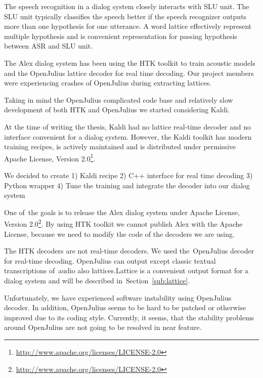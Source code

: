 The speech recognition in a dialog system closely interacts with \acl{SLU} unit.
The \ac{SLU} unit typically classifies the speech better 
if the speech recognizer outputs more than one hypothesis for one utterance. 
A word lattice effectively represent multiple hypothesis and is convenient
representation for passing hypothesis between \ac{ASR} and \ac{SLU} unit.

The Alex dialog system has been using the \ac{HTK} toolkit\cite{young94htk} 
to train acoustic models and 
the OpenJulius\cite{lee2009julius} lattice decoder for real time decoding. 
Our project members were experiencing crashes of OpenJulius during extracting lattices.

Taking in mind the OpenJulius complicated code base and relatively slow
development of both \ac{HTK} and OpenJulius we started considering Kaldi.

At the time of writing the thesis, Kaldi had no lattice real-time decoder
and no interface convenient for a dialog system.
However, the Kaldi toolkit has modern training recipes, 
is actively maintained and is distributed 
under permissive Apache License, Version 2.0\footnote{\url{http://www.apache.org/licenses/LICENSE-2.0}}.

We decided to create 
1) Kaldi recipe
2) C++ interface for real time decoding
3) Python wrapper
4) Tune the training and integrate the decoder into our dialog system



One of~the goals is to release the Alex dialog system under 
Apache License, Version 2.0\footnote{\url{http://www.apache.org/licenses/LICENSE-2.0}}. 
By using \ac{HTK} toolkit we cannot publish Alex with the Apache License, 
because we need to modify the code of the decoders we are using. 

The \ac{HTK} decoders are not real-time decoders\cite{yao2010practical}. 
We used the~OpenJulius decoder for real-time decoding. OpenJulius can output except classic textual transcriptions of~audio
also lattices.Lattice is a convenient output format for a dialog system and will be described in~Section~\ref{sub:lattice}.

Unfortunately, we have experienced software instability using OpenJulius decoder.  
In addition, OpenJulius seems to be hard to be patched or otherwise improved due to its coding style. 
Currently, it seems, that the stability problems around OpenJulius are not going to be resolved in near feature.

